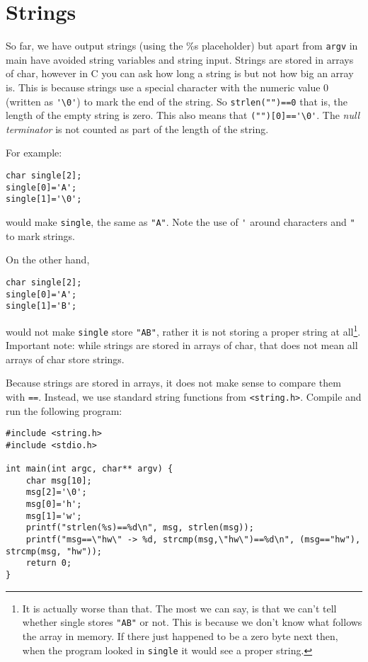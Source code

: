 
\chapter{Strings}



So far, we have output strings (using the \%s placeholder) but apart from \texttt{argv} in main have avoided string variables and string input.
Strings are stored in arrays of char, however in C you can ask how long a string is but not how big an array is.
This is because strings use a special character with the numeric value $0$ (written as \verb!'\0'!) to mark the end of the string.
So \lstinline!strlen("")==0! that is, the length of the empty string is zero.
This also means that \lstinline!("")[0]=='\0'!.
The \emph{null terminator} is not counted as part of the length of the string.


For example:

\begin{lstlisting}
char single[2];
single[0]='A';
single[1]='\0';
\end{lstlisting}

would make \texttt{single}, the same as \verb!"A"!.
Note the use of \verb!'! around characters and \verb!"! to mark strings.

On the other hand,
\begin{lstlisting}
char single[2];
single[0]='A';
single[1]='B';
\end{lstlisting}
would not make \texttt{single} store \verb!"AB"!, rather it is not storing a proper string at all\footnote{It is actually worse than that.
The most we can say, is that we can't tell whether single stores \texttt{"AB"} or not.
This is because we don't know what follows the array in memory.
If there just happened to be a zero byte next then, when the program looked in \texttt{single} it would see a proper string.
}.
Important note: while strings are stored in arrays of char, that does not mean all arrays of char store strings.

Because strings are stored in arrays, it does not make sense to compare them with \texttt{==}.
Instead, we use standard string functions from \lstinline{<string.h>}.
Compile and run the following program:
\begin{lstlisting}
#include <string.h>
#include <stdio.h>

int main(int argc, char** argv) {
    char msg[10];	
    msg[2]='\0';
    msg[0]='h';
    msg[1]='w';
    printf("strlen(%s)==%d\n", msg, strlen(msg));
    printf("msg==\"hw\" -> %d, strcmp(msg,\"hw\")==%d\n", (msg=="hw"), strcmp(msg, "hw"));
    return 0;
}
\end{lstlisting}

